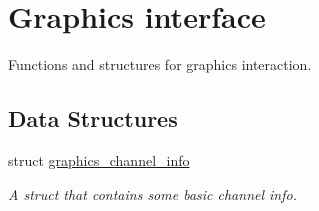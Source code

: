 \hypertarget{group__graphics}{}\section{Graphics interface}
\label{group__graphics}


Functions and structures for graphics interaction.  


\subsection*{Data Structures}
\begin{DoxyCompactItemize}
\item 
struct \hyperlink{structgraphics__channel__info}{graphics\+\_\+channel\+\_\+info}
\begin{DoxyCompactList}\small\item\em A struct that contains some basic channel info. \end{DoxyCompactList}\end{DoxyCompactItemize}
